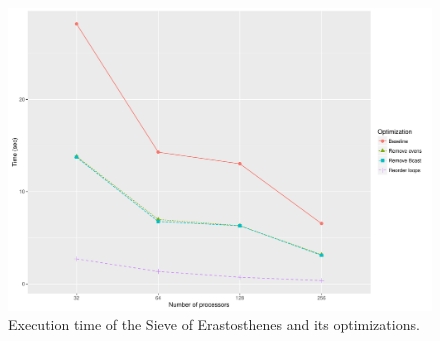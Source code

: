 \documentclass[10pt]{scrartcl}
\begin{document}
\begin{figure}
  \centering
  \includegraphics[width=\textwidth]{plot2}
  \caption{Execution time of the Sieve of Erastosthenes and its optimizations.}\label{fig:plot2}
\end{figure}
\end{document}
